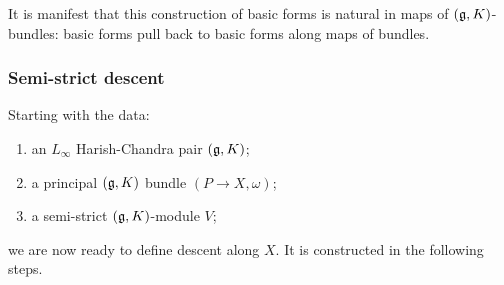 \documentclass[10pt]{amsart}
\begin{document}
It is manifest that this construction of basic forms is natural in maps of $(\mathfrak g,K)$-bundles: basic forms pull back to basic forms along maps of bundles.

\subsubsection{Semi-strict descent}

Starting with the data:
\begin{enumerate}
\item an $L_\infty$ Harish-Chandra pair $(\mathfrak g,K)$;
\item a principal $(\mathfrak g,K)$ bundle $(P \to X, \omega)$;
\item a semi-strict $(\mathfrak g,K)$-module $V$;
\end{enumerate}
we are now ready to define descent along $X$. 
It is constructed in the following steps.
\end{document}
